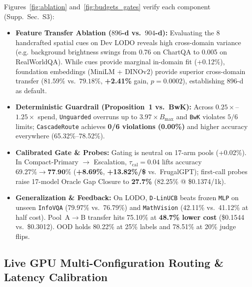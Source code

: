 \documentclass[10pt,twocolumn,letterpaper]{article}
\begin{document}
Figures~\ref{fig:ablation} and~\ref{fig:budgets_gates} verify each component (Supp.\ Sec.~S3):
\begin{itemize}
    \item \textbf{Feature Transfer Ablation ($896$-d vs.\ $904$-d):} Evaluating the 8 handcrafted spatial cues on Dev LODO reveals high cross-domain variance (e.g. background brightness swings from 0.76 on ChartQA to 0.005 on RealWorldQA). While cues provide marginal in-domain fit (+0.12\%), foundation embeddings (MiniLM + DINOv2) provide superior cross-domain transfer ($81.59\%$ vs.\ $79.18\%$, \textbf{+2.41\%} gain, $p{=}0.0002$), establishing $896$-d as default.
    \item \textbf{Deterministic Guardrail (Proposition~1 vs.\ BwK):} Across $0.25\times$--$1.25\times$ spend, \texttt{Unguarded} overruns up to $3.97\times B_{\max}$ and \texttt{BwK} violates $5/6$ limits; \texttt{CascadeRoute} achieves \textbf{0/6 violations (0.00\%)} and higher accuracy everywhere (65.32\%--78.52\%).
    \item \textbf{Calibrated Gate \& Probes:} Gating is neutral on 17-arm pools (+0.02\%). In Compact-Primary $\to$ Escalation, $\tau_{\text{cal}}{=}0.04$ lifts accuracy $69.27\% \to \textbf{77.90\%}$ (\textbf{+8.69\%}, \textbf{+13.82\%/\$} vs.\ FrugalGPT); first-call probes raise 17-model Oracle Gap Closure to \textbf{27.7\%} (82.25\% @ \$0.1374/1k).
    \item \textbf{Generalization \& Feedback:} On LODO, \texttt{D-LinUCB} beats frozen \texttt{MLP} on unseen \texttt{InfoVQA} (79.97\% vs.\ 76.79\%) and \texttt{MathVision} (42.11\% vs.\ 41.12\% at half cost). Pool~A$\to$B transfer hits 75.10\% at \textbf{48.7\% lower cost} (\$0.1544 vs.\ \$0.3012). OOD holds 80.22\% at 25\% labels and 78.51\% at 20\% judge flips.
\end{itemize}

\subsection{Live GPU Multi-Configuration Routing \& Latency Calibration}
\label{sec:configs_latency}
\end{document}
